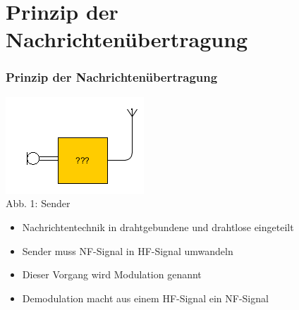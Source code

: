 

\subtitle{Technik Klasse E 14: \\
          Modulation \& Demodulation \\[2em]}
\date{Stand 07.12.2015}



\section*{Prinzip der Nachrichtenübertragung}
\begin{frame}
\frametitle{Prinzip der Nachrichtenübertragung}
\begin{center}
\includegraphics[scale=1.]{e14/Sender.png}\\
Abb. 1: Sender\\
\end{center}
\begin{itemize}
	\item Nachrichtentechnik in drahtgebundene und drahtlose eingeteilt
	\item Sender muss NF-Signal in HF-Signal umwandeln
	\item Dieser Vorgang wird Modulation genannt
	\item Demodulation macht aus einem HF-Signal ein NF-Signal
\end{itemize}
\end{frame}

